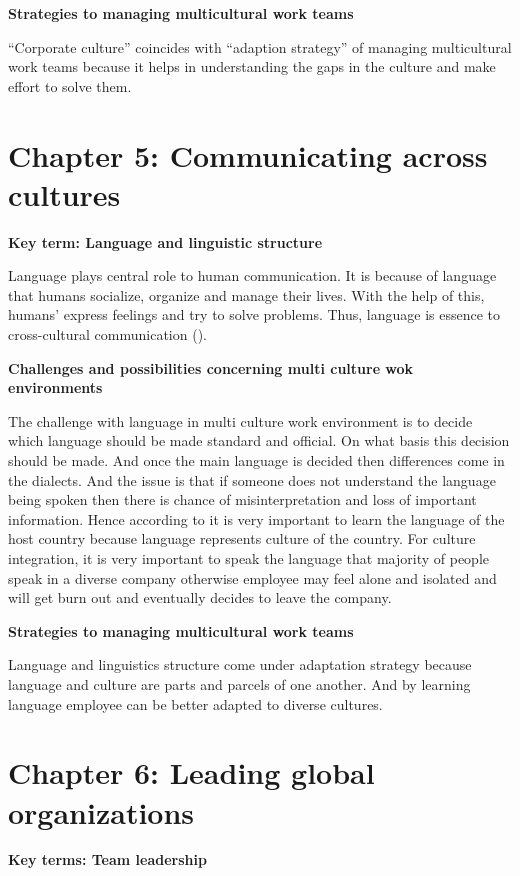 \documentclass{article}
\begin{document}
\textbf{Strategies to managing multicultural work teams}

“Corporate culture” coincides with “adaption strategy” of managing multicultural work teams because it helps in understanding the gaps in the culture and make effort to solve them.

\section{Chapter 5: Communicating across cultures}
\textbf{Key term: Language and linguistic structure}

Language plays central role to human communication. It is because of language that humans socialize, organize and manage their lives. With the help of this, humans’ express feelings and try to solve problems. Thus, language is essence to cross-cultural communication (\cite{steers2013management}). 

\textbf{Challenges and possibilities concerning multi culture wok environments}

The challenge with language in multi culture work environment is to decide which language should be made standard and official. On what basis this decision should be made. And once the main language is decided then differences come in the dialects. And the issue is that if someone does not understand the language being spoken then there is chance of misinterpretation and loss of important information. Hence according to \cite{steers2013management} it is very important to learn the language of the host country because language represents culture of the country. For culture integration, it is very important to speak the language that majority of people speak in a diverse company otherwise employee may feel alone and isolated and will get burn out and eventually decides to leave the company. 

\textbf{Strategies to managing multicultural work teams}

Language and linguistics structure come under adaptation strategy because language and culture are parts and parcels of one another. And by learning language employee can be better adapted to diverse cultures. 

\section{Chapter 6: Leading global organizations}

\textbf{Key terms: Team leadership}
\end{document}
